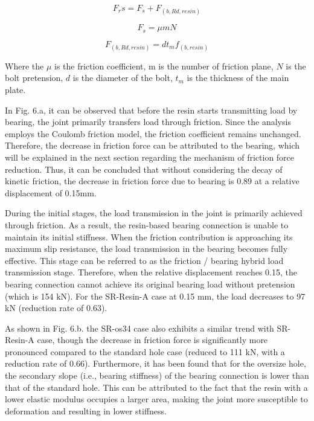 \begin{equation}\label{eq-app3-1}
    F_rs=F_s+F_{(b,Rd,resin)}
\end{equation}

\begin{equation}
    F_s=μmN
\end{equation}

\begin{equation}
 F_{(b,Rd,resin)}=dt_m f_{(b,resin)}
\end{equation}

Where the $μ$ is the friction coefficient, m is the number of friction plane,  $N$ is the bolt pretension, $d$ is the diameter of the bolt, $t_m$ is the thickness of the main plate.

In Fig. 6.a, it can be observed that before the resin starts transmitting load by bearing, the joint primarily transfers load through friction. Since the analysis employs the Coulomb friction model, the friction coefficient remains unchanged. Therefore, the decrease in friction force can be attributed to the bearing, which will be explained in the next section regarding the mechanism of friction force reduction. Thus, it can be concluded that without considering the decay of kinetic friction, the decrease in friction force due to bearing is 0.89 at a relative displacement of 0.15mm.

During the initial stages, the load transmission in the joint is primarily achieved through friction. As a result, the resin-based bearing connection is unable to maintain its initial stiffness. When the friction contribution is approaching its maximum slip resistance, the load transmission in the bearing becomes fully effective. This stage can be referred to as the friction / bearing hybrid load transmission stage. Therefore, when the relative displacement reaches 0.15, the bearing connection cannot achieve its original bearing load without pretension (which is 154 kN). For the SR-Resin-A case at 0.15 mm, the load decreases to 97 kN (reduction rate of 0.63).

As shown in Fig. 6.b. the SR-os34 case also exhibits a similar trend with SR-Resin-A case, though the decrease in friction force is significantly more pronounced compared to the standard hole case (reduced to 111 kN, with a reduction rate of 0.66). Furthermore, it has been found that for the oversize hole, the secondary slope (i.e., bearing stiffness) of the bearing connection is lower than that of the standard hole. This can be attributed to the fact that the resin with a lower elastic modulus occupies a larger area, making the joint more susceptible to deformation and resulting in lower stiffness.

